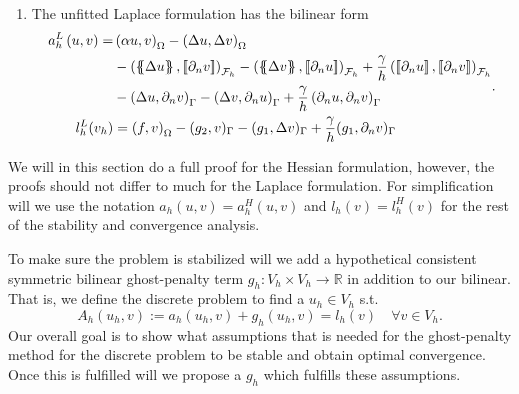 \begin{enumerate}[label=\arabic*)]
    \item The unfitted Laplace formulation has the bilinear form
    \begin{equation}
        \label{eq:cip_unfitted_laplace_form}
        \begin{split}
            a_{h}^{L} \left( u, v \right)   =&
            \left( \alpha  u, v \right) _{\Omega }   -  \left( \Delta  u, \Delta v \right) _{ \Omega } \\
                                             & - \left( \mean{  \Delta  u }, \jump{ \partial _{n }v} \right)_{\mathcal{F}_{h}  }  - \left( \mean{ \Delta  v }, \jump{ \partial _{n}u }      \right)_{\mathcal{F}_{h}  }  + \frac{\gamma }{h}  \left( \jump{ \partial _{n} u}, \jump{ \partial _{n} v   }   \right)_{\mathcal{F}_{h} } \\
                                             & - \left(   \Delta  u ,  \partial _{n }v \right)_{\Gamma   }  - \left(  \Delta  v ,  \partial _{n}u       \right)_{\Gamma  }  + \frac{\gamma }{h}  \left(  \partial _{n} u,  \partial _{n} v      \right)_{ \Gamma } \\
                                             l^{L}_{h}( v_{h}) & =  \left( f, v \right) _{\Omega } - ( g_{2},  v )_{\Gamma } -  ( g_{1}, \Delta  v  )_{\Gamma }  + \frac{\gamma }{h} ( g_{1}, \partial _{n} v  )_{\Gamma }
                                         \end{split}
                                         .
                                     \end{equation}

\end{enumerate}
We will in this section do a full proof for the Hessian formulation, however, the proofs should not differ to much for the Laplace formulation. For simplification will we use the notation $a_{h}(u,v ) = a_{h}^{H}( u,v)$ and $l_{h}(v) =l_{h}^{H}(v)$ for the rest of the stability and convergence analysis.

To make sure the problem is stabilized will we add a hypothetical consistent symmetric bilinear ghost-penalty term  $g_{h}: V_{h} \times  V_{h} \to \mathbb{R} $ in addition to our bilinear. That is, we define the discrete problem to find a $u_{h} \in V_{h}$ s.t.
\begin{equation}
\label{eq:discrete_CutCIP_prob}
A_{h}( u_{h} ,v ) := a_{h}( u_{h}, v)  + g_{h}( u_{h},v) = l_{h} ( v) \quad  \forall v \in  V_{h}.
\end{equation}
Our overall goal is to show what assumptions that is needed for the ghost-penalty method for the discrete problem to be stable and obtain optimal convergence.  Once this is fulfilled will we propose a $g_{h}$ which fulfills these assumptions.

